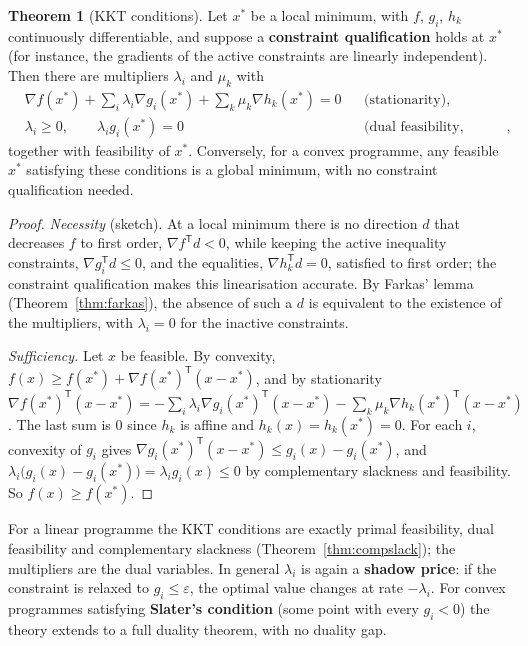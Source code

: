 \documentclass[11pt,a4paper]{article}
\numberwithin{equation}{section}
\theoremstyle{definition}
\newtheorem{thm}{Theorem}[subsection]
\begin{document}
\begin{thm}[KKT conditions]
\label{thm:kkt}
Let $x^*$ be a local minimum, with $f$, $g_i$, $h_k$ continuously differentiable, and suppose a \textbf{constraint qualification} holds at $x^*$ (for instance, the gradients of the active constraints are linearly independent). Then there are multipliers $\lambda_i$ and $\mu_k$ with
\begin{align*}
&\nabla f(x^*) + \sum_i\lambda_i\nabla g_i(x^*) + \sum_k\mu_k\nabla h_k(x^*) = 0 && \text{(stationarity)}, \\
&\lambda_i \geq 0, \qquad \lambda_ig_i(x^*) = 0 && \text{(dual feasibility, complementary slackness)},
\end{align*}
together with feasibility of $x^*$. Conversely, for a convex programme, any feasible $x^*$ satisfying these conditions is a global minimum, with no constraint qualification needed.
\end{thm}

\begin{proof}
\emph{Necessity} (sketch). At a local minimum there is no direction $d$ that decreases $f$ to first order, $\nabla f^{\mathsf T}d < 0$, while keeping the active inequality constraints, $\nabla g_i^{\mathsf T}d \leq 0$, and the equalities, $\nabla h_k^{\mathsf T}d = 0$, satisfied to first order; the constraint qualification makes this
linearisation accurate. By Farkas' lemma (Theorem~\ref{thm:farkas}), the absence of such a $d$ is equivalent to the existence of the multipliers, with $\lambda_i = 0$ for the inactive constraints.

\emph{Sufficiency.} Let $x$ be feasible. By convexity, $f(x) \geq f(x^*) + \nabla f(x^*)^{\mathsf T}(x - x^*)$, and by stationarity $\nabla f(x^*)^{\mathsf T}(x - x^*) = -\sum_i\lambda_i\nabla g_i(x^*)^{\mathsf T}(x - x^*) - \sum_k\mu_k\nabla h_k(x^*)^{\mathsf T}(x - x^*)$. The last sum is $0$ since $h_k$ is affine and
$h_k(x) = h_k(x^*) = 0$. For each $i$, convexity of $g_i$ gives $\nabla g_i(x^*)^{\mathsf T}(x - x^*) \leq g_i(x) - g_i(x^*)$, and $\lambda_i\bigl(g_i(x) - g_i(x^*)\bigr) = \lambda_ig_i(x) \leq 0$ by complementary slackness and feasibility. So $f(x) \geq f(x^*)$.
\end{proof}

For a linear programme the KKT conditions are exactly primal feasibility, dual feasibility and complementary slackness (Theorem~\ref{thm:compslack}); the multipliers are the dual variables. In general $\lambda_i$ is again a \textbf{shadow price}: if the constraint is relaxed to $g_i \leq \varepsilon$, the optimal value changes at
rate $-\lambda_i$. For convex programmes satisfying \textbf{Slater's condition} (some point with every $g_i < 0$) the theory extends to a full duality theorem, with no duality gap.
\end{document}
